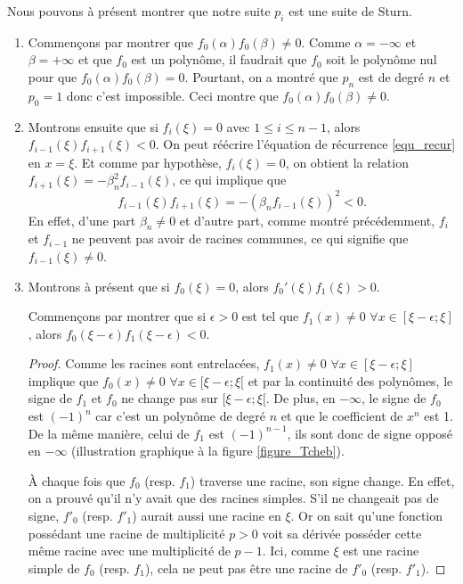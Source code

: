 	Nous pouvons à présent montrer que notre suite $p_i$ est une suite de Sturn.
\begin{enumerate}
  \item Commençons par montrer que $f_0(\alpha)f_0(\beta) \neq 0$.
    Comme $\alpha = -\infty$ et $\beta = + \infty$ et que $f_0$ est un polynôme,
    il faudrait que $f_0$ soit le polynôme nul pour que $f_0(\alpha)f_0(\beta) = 0$.
    Pourtant, on a montré que $p_n$ est de degré $n$ et $p_0 = 1$ donc
    c'est impossible. Ceci montre que $f_0(\alpha)f_0(\beta) \neq 0$.
  \item Montrons ensuite que si $f_i(\xi) = 0$ avec $1 \leq i \leq n-1$,
    alors $f_{i-1}(\xi)f_{i+1}(\xi) < 0$.
    On peut réécrire l'équation de récurrence \eqref{equ_recur} en $x=\xi$.
    Et comme par hypothèse, $f_i(\xi)=0$, on obtient la relation
    $f_{i+1}(\xi) = -\beta_n^2f_{i-1}(\xi)$, ce qui implique que
    \[ f_{i-1}(\xi)f_{i+1}(\xi) = -(\beta_nf_{i-1}(\xi))^2 < 0. \]
    En effet, d'une part $\beta_n \neq 0$ et d'autre part, comme montré précédemment, $f_i$ et $f_{i-1}$ ne peuvent
    pas avoir de racines communes, ce qui signifie que $f_{i-1}(\xi) \neq 0$.
  \item Montrons à présent que si $f_0(\xi) = 0$,
    alors $f_0'(\xi)f_1(\xi) > 0$.

    Commençons par montrer que si $\epsilon > 0$ est tel que
    $f_1(x) \neq 0$ $\forall x \in [\xi - \epsilon; \xi]$, alors
    $f_0(\xi-\epsilon) f_1(\xi-\epsilon) < 0$.

    \begin{proof}
      Comme les racines sont entrelacées,
      $f_1(x) \neq 0$ $\forall x \in [\xi - \epsilon; \xi]$ implique que
      $f_0(x) \neq 0$ $\forall x \in [\xi - \epsilon; \xi[$
      et par la continuité des polynômes, le signe de $f_1$ et $f_0$ ne change pas
      sur $[\xi - \epsilon; \xi[$.
      De plus, en $-\infty$,
      le signe de $f_0$ est $(-1)^n$ car c'est un polynôme de
      degré $n$ et que le coefficient de $x^n$ est 1.
      De la même manière, celui de $f_1$ est $(-1)^{n-1}$,
      ils sont donc de signe opposé en $-\infty$ (illustration graphique à la figure \ref{figure_Tcheb}).


      À chaque fois que $f_0$ (resp. $f_1$) traverse une racine, son signe change.
      En effet, on a prouvé qu'il n'y avait que des racines simples.
      S'il ne changeait pas de signe, $f'_0$ (resp. $f'_1$) aurait
      aussi une racine en $\xi$.
      Or on sait qu'une fonction possédant une racine de multiplicité $p > 0$
      voit sa dérivée posséder cette même racine avec une multiplicité de $p-1$.
      Ici, comme $\xi$ est une racine simple de $f_0$ (resp. $f_1$),
      cela ne peut pas être une racine de $f'_0$ (resp. $f'_1$).


\end{proof}
\end{enumerate}
